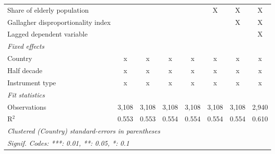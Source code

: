 \begin{tabular}{lccccccc}
   Share of elderly population                                             &              &              &              &              & X            & X            & X\\  
   Gallagher disproportionality index                                      &              &              &              &              &              & X            & X\\  
   Lagged dependent variable                                               &              &              &              &              &              &              & X\\  
   \emph{Fixed effects}\\
   Country                                                                 & x            & x            & x            & x            & x            & x            & x\\  
   Half decade                                                             & x            & x            & x            & x            & x            & x            & x\\  
   Instrument type                                                         & x            & x            & x            & x            & x            & x            & x\\  
   \midrule \emph{Fit statistics}\\
   Observations                                                            & 3,108        & 3,108        & 3,108        & 3,108        & 3,108        & 3,108        & 2,940\\  
   R$^2$                                                                   & 0.553        & 0.553        & 0.554        & 0.554        & 0.554        & 0.554        & 0.610\\  
   \midrule
   \multicolumn{8}{l}{\emph{Clustered (Country) standard-errors in parentheses}}\\
   \multicolumn{8}{l}{\emph{Signif. Codes: ***: 0.01, **: 0.05, *: 0.1}}\\
\end{tabular}
\par\endgroup


